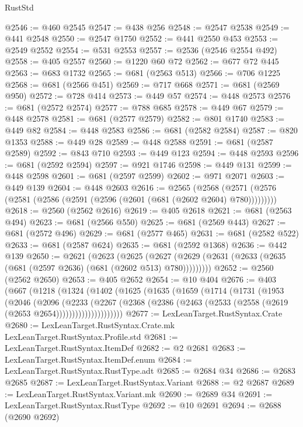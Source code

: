 \begin{lexlean}{RustStd}
\begin{coremodule}
@2546 := @460 @2545
@2547 := @438 @256
@2548 := @2547 @2538
@2549 := @441 @2548
@2550 := @2547 @1750
@2552 := @441 @2550 @453
@2553 := @2549 @2552
@2554 := @531 @2553
@2557 := @2536 (@2546 @2554 @492)
@2558 := @405 @2557
@2560 := @1220 @60 @72
@2562 := @677 @72 @445
@2563 := @683 @1732
@2565 := @681 (@2563 @513)
@2566 := @706 @1225
@2568 := @681 (@2566 @451)
@2569 := @717 @668
@2571 := @681 (@2569 @950)
@2572 := @728 @414
@2573 := @449 @57
@2574 := @448 @2573
@2576 := @681 (@2572 @2574)
@2577 := @788 @685
@2578 := @449 @67
@2579 := @448 @2578
@2581 := @681 (@2577 @2579)
@2582 := @801 @1740
@2583 := @449 @82
@2584 := @448 @2583
@2586 := @681 (@2582 @2584)
@2587 := @820 @1353
@2588 := @449 @28
@2589 := @448 @2588
@2591 := @681 (@2587 @2589)
@2592 := @843 @710
@2593 := @449 @123
@2594 := @448 @2593
@2596 := @681 (@2592 @2594)
@2597 := @921 @1746
@2598 := @449 @131
@2599 := @448 @2598
@2601 := @681 (@2597 @2599)
@2602 := @971 @2071
@2603 := @449 @139
@2604 := @448 @2603
@2616 := @2565
    (@2568 (@2571 (@2576 (@2581 (@2586 (@2591 (@2596 (@2601 (@681 (@2602 @2604) @780)))))))))
@2618 := @2560 (@2562 @2616)
@2619 := @405 @2618
@2621 := @681 (@2563 @494)
@2623 := @681 (@2566 @550)
@2625 := @681 (@2569 @443)
@2627 := @681 (@2572 @496)
@2629 := @681 (@2577 @465)
@2631 := @681 (@2582 @522)
@2633 := @681 (@2587 @624)
@2635 := @681 (@2592 @1368)
@2636 := @442 @139
@2650 := @2621
    (@2623
      (@2625 (@2627 (@2629 (@2631 (@2633 (@2635 (@681 (@2597 @2636) (@681 (@2602 @513) @780)))))))))
@2652 := @2560 (@2562 @2650)
@2653 := @405 @2652
@2654 := @10 @404
@2676 := @403
    (@667
      (@1218
        (@1324
          (@1402
            (@1625
              (@1635
                (@1659
                  (@1714
                    (@1731
                      (@1953
                        (@2046
                          (@2096
                            (@2233
                              (@2267
                                (@2368
                                  (@2386
                                    (@2463 (@2533 (@2558 (@2619 (@2653 @2654)))))))))))))))))))))
@2677 := LexLeanTarget.RustSyntax.Crate
@2680 := LexLeanTarget.RustSyntax.Crate.mk LexLeanTarget.RustSyntax.Profile.std
@2681 := LexLeanTarget.RustSyntax.ItemDef
@2682 := @2 @2681
@2683 := LexLeanTarget.RustSyntax.ItemDef.enum
@2684 := LexLeanTarget.RustSyntax.RustType.adt
@2685 := @2684 @34
@2686 := @2683 @2685
@2687 := LexLeanTarget.RustSyntax.Variant
@2688 := @2 @2687
@2689 := LexLeanTarget.RustSyntax.Variant.mk
@2690 := @2689 @34
@2691 := LexLeanTarget.RustSyntax.RustType
@2692 := @10 @2691
@2694 := @2688 (@2690 @2692)

\end{coremodule}
\end{lexlean}
